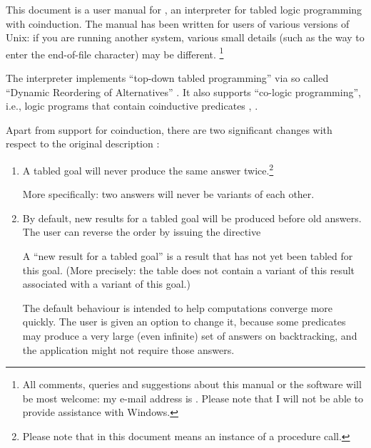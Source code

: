 

This document is a user manual for , an interpreter for tabled
logic programming with coinduction.  The manual has been written for users of
various versions of Unix: if you are running another system, various small
details (such as the way to enter the end-of-file character) may be
different.%
\footnote{
  All comments, queries and suggestions about this manual or the software
  will be most welcome: my e-mail address is
  .  Please note that I will not be able
  to provide assistance with Windows.}

The interpreter implements ``top-down tabled programming'' via so called
``Dynamic Reordering of Alternatives'' \cite{guo-gupta-dra}.  It also
supports ``co-logic programming'', i.e., logic programs that contain
coinductive predicates \cite{coinductive}, \cite{co-LP}.


Apart from support for coinduction, there are two significant changes with
respect to the original description \cite{guo-gupta-dra}:
\begin{enumerate}

\item
  A tabled goal will never produce the same answer twice.\footnote{
  Please note that in this document  means an instance of a
  procedure call.}

  More specifically: two answers will never be variants of each
  other.

\item
  By default, new results for a tabled goal will be produced before old
  answers.  The user can reverse the order by issuing the directive\\
  \ind{}

  A ``new result for a tabled goal'' is a result that has not yet been
  tabled for this goal.  (More precisely: the table does not contain a
  variant of this result associated with a variant of this goal.)

  The default behaviour is intended to help computations converge more
  quickly.  The user is given an option to change it, because some predicates
  may produce a very large (even infinite) set of answers on backtracking,
  and the application might not require those answers.
\end{enumerate}



